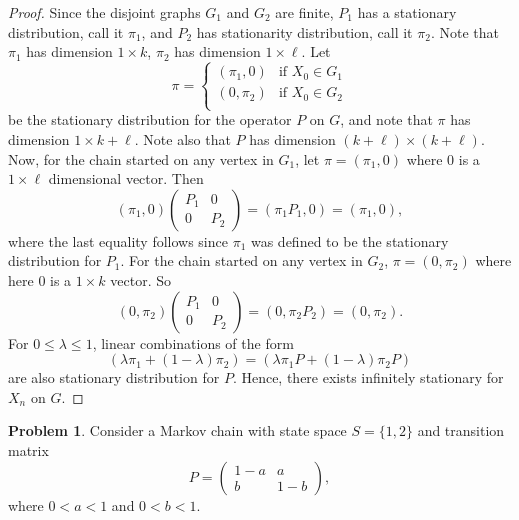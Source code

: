 \documentclass[oneside,reqno]{amsart}
\theoremstyle{definition}
\newtheorem{prob}{Problem}
\begin{document}
\begin{enumerate}
\begin{proof}
Since the disjoint graphs $G_1$ and $G_2$ are finite, $P_1$ has a stationary distribution, call it $\pi_1$, and $P_2$ has stationarity distribution, call it $\pi_2$. Note that $\pi_1$ has dimension $1\times k$, $\pi_2$ has dimension $1 \times \ell$. Let 
\[
	\pi = \begin{cases}
		(\pi_1, 0) & \text{if } X_0  \in G_1 \\
		(0, \pi_2) & \text{if } X_0  \in G_2 \\ 
	\end{cases}
\] 
be the stationary distribution for the operator $P$ on $G$, and note that $\pi$ has dimension $1 \times k+\ell$. Note also that $P$ has dimension $(k+\ell) \times (k+\ell)$. Now, for the chain started on any vertex in $G_1$, let $\pi = (\pi_1, 0)$ where $0$ is a $1 \times \ell$ dimensional vector. Then 
\[
	(\pi_1, 0)
	\begin{pmatrix}
		P_1 & 0 \\
		0 & P_2 
	\end{pmatrix} 
	=(\pi_1 P_1, 0)
	= (\pi_1, 0),
\] 
where the last equality follows since $\pi_1$ was defined to be the stationary distribution for $P_1$. For the chain started on any vertex in $G_2$, $\pi =  (0,\pi_2)$ where here $0$ is a $1 \times k$ vector. So
\[
	(0, \pi_2)
	\begin{pmatrix}
		P_1 & 0 \\
		0 & P_2 
	\end{pmatrix} 
	= (0, \pi_2 P_2)
	=(0, \pi_2).
\]
For $0 \leq \lambda \leq 1$, linear combinations of the form
\[
	( \lambda \pi_1 + (1-\lambda) \pi_2 ) = ( \lambda \pi_1 P + (1-\lambda) \pi_2 P)
\]
are also stationary distribution for $P$. Hence, there exists infinitely stationary for $X_n$ on $G$.
\end{proof}
\end{enumerate}

\begin{prob}
Consider a Markov chain with state space $S=\{1,2\}$ and transition matrix 
\[
	P = \begin{pmatrix}
		1-a & a \\
		b & 1-b
	\end{pmatrix},
\]
where $0<a<1$ and $0<b<1$. 
\end{prob}
\end{document}
